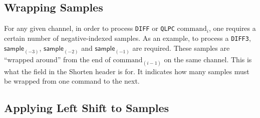 \begin{table}[h]
{\begin{tabular}{rr>{$}r<{$}>{$}r<{$}||>{$}r<{$}}
  \end{tabular}
  \renewcommand{\arraystretch}{1.0}
}
\end{table}

\clearpage

\subsection{Wrapping Samples}
\label{shorten:wrap_samples}

For any given channel, in order to process \texttt{DIFF} or
\texttt{QLPC} $\text{command}_i$,
one requires a certain number of negative-indexed samples.
As an example, to process a \texttt{DIFF3},
$\textsf{sample}_{(-3)}$, $\textsf{sample}_{(-2)}$ and $\textsf{sample}_{(-1)}$
are required.
These samples are ``wrapped around'' from the end of $\text{command}_{(i - 1)}$
on the same channel.
This is what the  field in the Shorten header is for.
It indicates how many samples must be wrapped from one command
to the next.

\subsection{Applying Left Shift to Samples}
\label{shorten:apply_leftshift}
\EALGORITHM

